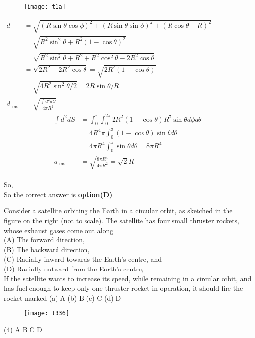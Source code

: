 \begin{questions}
\begin{answer}
\begin{figure}[H]
		\centering
		\texttt{[image: t1a]}
	\end{figure}
$\begin{aligned} d &=\sqrt{(R \sin \theta \cos \phi)^{2}+(R \sin \theta \sin \phi)^{2}+(R \cos \theta-R)^{2}} \\ &=\sqrt{R^{2} \sin ^{2} \theta+R^{2}(1-\cos \theta)^{2}} \\ &=\sqrt{R^{2} \sin ^{2} \theta+R^{2}+R^{2} \cos ^{2} \theta-2 R^{2} \cos \theta} \\ &=\sqrt{2 R^{2}-2 R^{2} \cos \theta}=\sqrt{2 R^{2}(1-\cos \theta)} \\ &=\sqrt{4 R^{2} \sin ^{2} \theta / 2}=2 R \sin \theta / R \\ d_{\mathrm{rms}} &=\sqrt{\frac{\int d^{2} d S}{4 \pi R^{2}}} \end{aligned}$\\
$$
\begin{aligned}
\int d^{2} d S &=\int_{0}^{\pi} \int_{0}^{2 \pi} 2 R^{2}(1-\cos \theta) R^{2} \sin \theta d \phi d \theta \\
&=4 R^{4} \pi \int_{0}^{\pi}(1-\cos \theta) \sin \theta d \theta \\
&=4 \pi R^{4} \int_{0}^{\pi} \sin \theta d \theta=8 \pi R^{4} \\
d_{\mathrm{rms}} &=\sqrt{\frac{8 \pi R^{4}}{4 \pi R^{2}}}=\sqrt{2} R
\end{aligned}
$$\\
So,\\
	So the correct answer is \textbf{option(D)}
\end{answer}
\begin{minipage}{\textwidth}
	\question Consider a satellite orbiting the Earth in a circular orbit, as sketched in the figure on the right (not to scale). The satellite has four small thruster rockets, whose exhaust gases come out along\\
	(A) The forward direction,\\
	(B) The backward direction,\\
	(C) Radially inward towards the Earth's centre, and\\
	(D) Radially outward from the Earth's centre,\\
	If the satellite wants to increase its speed, while remaining in a circular orbit, and has fuel enough to keep only one thruster rocket in operation, it should fire the rocket marked
	(a) $\mathrm{A}$
	(b) $\mathrm{B}$
	(c) $\mathrm{C}$
	(d) $\mathrm{D}$
\end{minipage}
\begin{figure}[H]
	\centering
	\texttt{[image: t336]}
\end{figure}
\begin{tasks}(4)
	\task[\textbf{A.}] A
	\task[\textbf{B.}] B
	\task[\textbf{C.}] C
	\task[\textbf{D.}] D
\end{tasks}
\begin{answer}
	

\end{answer}
\end{questions}
